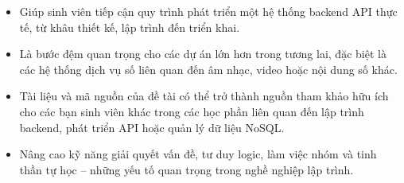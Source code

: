 \begin{itemize}
    \item Giúp sinh viên tiếp cận quy trình phát triển một hệ thống backend API thực tế, từ khâu thiết kế, lập trình đến triển khai.
    \item Là bước đệm quan trọng cho các dự án lớn hơn trong tương lai, đặc biệt là các hệ thống dịch vụ số liên quan đến âm nhạc, video hoặc nội dung số khác.
    \item Tài liệu và mã nguồn của đề tài có thể trở thành nguồn tham khảo hữu ích cho các bạn sinh viên khác trong các học phần liên quan đến lập trình backend, phát triển API hoặc quản lý dữ liệu NoSQL.
    \item Nâng cao kỹ năng giải quyết vấn đề, tư duy logic, làm việc nhóm và tinh thần tự học – những yếu tố quan trọng trong nghề nghiệp lập trình.
\end{itemize}
